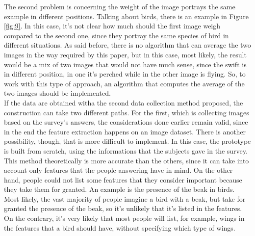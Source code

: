 \documentclass[conference]{IEEEtran}
\begin{document}
			\noindent The second problem is concerning the weight of the image portrays the same example in different positions. Talking about birds, there is an example in Figure \ref{fig:9}. In this case, it's not clear 
			how much should the first image weigh compared to the second one, since they portray the same species of bird in different situations. As said before, there is no algorithm that can average the two images in the 
			way required by this paper, but in this case, most likely, the result would be a mix of two images that would not have much sense, since the swift is in different position, in one it's perched while in the other 
			image is flying. So, to work with this type of approach, an algorithm that computes the average of the two images should be implemented.\\
			If the data are obtained witha the second data collection method proposed, the construction can take two different paths. For the first, which is collecting images based on the survey's answers, the 
			considerations done earlier remain valid, since in the end the feature extraction happens on an image dataset. There is another possibility, though, that is more difficult to implement. In this case, the 
			prototype is built from scratch, using the informations that the subjects gave in the survey. This method theoretically is more accurate than the others, since it can take into account only features 
			that the people answering have in mind. On the other hand, people could not list some features that they consider important because they take them for granted. An example is the presence of the beak in birds. 
			Most likely, the vast majority of people imagine a bird with a beak, but take for granted the presence of the beak, so it's unlikely that it's listed in the features. On the contrary, it's very likely that 
			most people will list, for example, wings in the features that a bird should have, without specifying which type of wings. 
			
\end{document}

